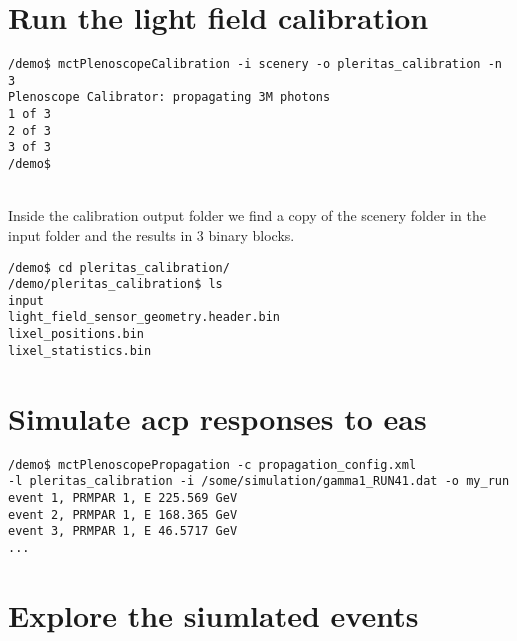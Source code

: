 \section{Run the light field calibration}
%
\begin{minipage}{\linewidth}%
\begin{lstlisting}[style=MctBash]
/demo$ mctPlenoscopeCalibration -i scenery -o pleritas_calibration -n 3
Plenoscope Calibrator: propagating 3M photons
1 of 3
2 of 3
3 of 3
/demo$ 
\end{lstlisting}
\end{minipage}\\
%
Inside the calibration output folder we find a copy of the scenery folder in the input folder and the results in 3 binary blocks.\\
%
\begin{minipage}{\linewidth}%
\begin{lstlisting}[style=MctBash]
/demo$ cd pleritas_calibration/
/demo/pleritas_calibration$ ls
input  
light_field_sensor_geometry.header.bin  
lixel_positions.bin  
lixel_statistics.bin
\end{lstlisting}
\end{minipage}%

%
\section{Simulate \ac{acp} responses to \ac{eas}}
%
\begin{lstlisting}[style=MctBash]
/demo$ mctPlenoscopePropagation -c propagation_config.xml 
-l pleritas_calibration -i /some/simulation/gamma1_RUN41.dat -o my_run
event 1, PRMPAR 1, E 225.569 GeV
event 2, PRMPAR 1, E 168.365 GeV
event 3, PRMPAR 1, E 46.5717 GeV
...
\end{lstlisting}
\section{Explore the siumlated events}

